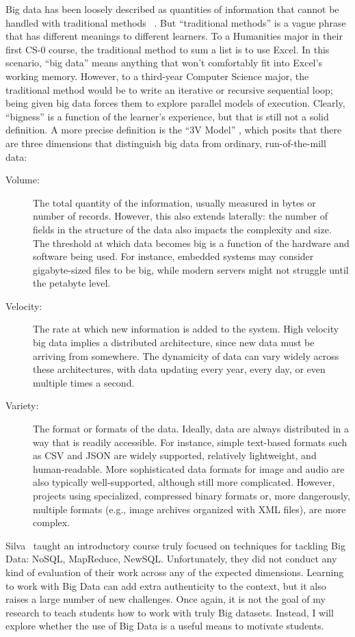 Big data has been loosely described as quantities of information that cannot be handled with traditional methods ~\cite{McKinsey}.
But ``traditional methods'' is a vague phrase that has different meanings to different learners. To a Humanities major in their first CS-0 course, the traditional method to sum a list is to use Excel. In this scenario, ``big data'' means anything that won't comfortably fit into Excel's working memory.
However, to a third-year Computer Science major, the traditional method would be to write an iterative or recursive sequential loop; being given big data forces them to explore parallel models of execution.
Clearly, ``bigness'' is a function of the learner's experience, but that is still not a solid definition.
A more precise definition is the ``3V Model'' \cite{douglas2012importance}, which posits that there are three dimensions that distinguish big data from ordinary, run-of-the-mill data:

\begin{description}
	\item[Volume:] The total quantity of the information, usually measured in bytes or number of records. However, this also extends laterally: the number of fields in the structure of the data also impacts the complexity and size. The threshold at which data becomes big is a function of the hardware and software being used. For instance, embedded systems may consider gigabyte-sized files to be big, while modern servers might not struggle until the petabyte level.
	\item[Velocity:] The rate at which new information is added to the system. High velocity big data implies a distributed architecture, since new data must be arriving from somewhere. The dynamicity of data can vary widely across these architectures, with data updating every year, every day, or even multiple times a second.
	\item[Variety:] The format or formats of the data. Ideally, data are always distributed in a way that is readily accessible. For instance, simple text-based formats such as CSV and JSON are widely supported, relatively lightweight, and human-readable. More sophisticated data formats for image and audio are also typically well-supported, although still more complicated. However, projects using specialized, compressed binary formats or, more dangerously, multiple formats (e.g., image archives organized with XML files), are more complex.
\end{description}

Silva~\cite{Silva:2014} taught an introductory course truly focused on techniques for tackling Big Data: NoSQL, MapReduce, NewSQL.
Unfortunately, they did not conduct any kind of evaluation of their work across any of the expected dimensions. 
Learning to work with Big Data can add extra authenticity to the context, but it also raises a large number of new challenges.
Once again, it is not the goal of my research to teach students how to work with truly Big datasets. Instead, I will explore whether the use of Big Data is a useful means to motivate students.